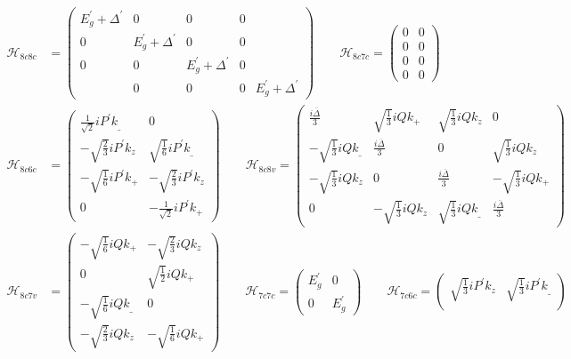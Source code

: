 \begin{align*}
\mathcal{H}_{8c8c}&=\begin{pmatrix}
E_g^{'}+\Delta^{'} & 0 & 0 & 0 \\
0 & E_g^{'}+\Delta^{'} & 0  & 0 \\
0 &0 &E_g^{'}+\Delta^{'} & 0 \\
& 0 & 0 & 0 &E_g^{'}+\Delta^{'} 
\end{pmatrix}\qquad
\mathcal{H}_{8c7c}=\begin{pmatrix}
0 & 0 \\
0 & 0 \\
0 & 0 \\
0 & 0 
\end{pmatrix}\\
\mathcal{H}_{8c6c}&=\begin{pmatrix}
\frac{1}{\sqrt{2}}iP^{'}k_\_  &0\\
-\sqrt{\frac{2}{3}}iP^{'}k_z & \sqrt{\frac{1}{6}}iP^{'}k_\_ \\
-\sqrt{\frac{1}{6}}iP^{'}k_+ & -\sqrt{\frac{2}{3}}iP^{'}k_z \\
0 & -\frac{1}{\sqrt{2}}iP^{'}k_+ 
\end{pmatrix}\qquad
\mathcal{H}_{8c8v}=\begin{pmatrix}
\frac{i\overline{\Delta}}{3} &\sqrt{\frac{1}{3}}iQk_+ & \sqrt{\frac{1}{3}}iQk_z & 0\\
-\sqrt{\frac{1}{3}}iQk_\_ &\frac{i\overline{\Delta}}{3} &0 & \sqrt{\frac{1}{3}}iQk_z\\
-\sqrt{\frac{1}{3}}iQk_z &0 &\frac{i\overline{\Delta}}{3} &-\sqrt{\frac{1}{3}}iQk_+\\
 0  &-\sqrt{\frac{1}{3}}iQk_z & \sqrt{\frac{1}{3}}iQk_\_ &\frac{i\overline{\Delta}}{3}
\end{pmatrix}\\
\mathcal{H}_{8c7v}&=\begin{pmatrix}
-\sqrt{\frac{1}{6}}iQk_+ &-\sqrt{\frac{2}{3}}iQk_z \\
0 &\sqrt{\frac{1}{2}}iQk_+ \\
-\sqrt{\frac{1}{6}}iQk_\_ &0\\
-\sqrt{\frac{2}{3}}iQk_z &-\sqrt{\frac{1}{6}}iQk_+
\end{pmatrix}\qquad
\mathcal{H}_{7c7c}=\begin{pmatrix}
 E_g^{'} &0\\
 0 &E_g^{'}
\end{pmatrix}\qquad
\mathcal{H}_{7c6c}=\begin{pmatrix}
 \sqrt{\frac{1}{3}}iP^{'}k_z & \sqrt{\frac{1}{3}}iP^{'}k_\_ \\

\end{pmatrix}
\end{align*}
